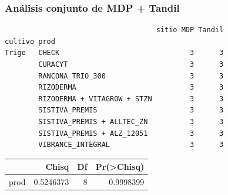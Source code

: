 \documentclass[
  letterpaper,
  DIV=11,
  numbers=noendperiod]{scrartcl}
\begin{document}
\hypertarget{anuxe1lisis-conjunto-de-mdp-tandil-1}{%
\subsubsection{Análisis conjunto de MDP +
Tandil}\label{anuxe1lisis-conjunto-de-mdp-tandil-1}}

\begin{verbatim}
                                    sitio MDP Tandil
cultivo prod                                        
Trigo   CHECK                               3      3
        CURACYT                             3      3
        RANCONA_TRIO_300                    3      3
        RIZODERMA                           3      3
        RIZODERMA + VITAGROW + STZN         3      3
        SISTIVA_PREMIS                      3      3
        SISTIVA_PREMIS + ALLTEC_ZN          3      3
        SISTIVA_PREMIS + ALZ_12051          3      3
        VIBRANCE_INTEGRAL                   3      3
\end{verbatim}

\begin{longtable}[]{@{}lrrr@{}}
\toprule()
& Chisq & Df & Pr(\textgreater Chisq) \\
\midrule()
\endhead
prod & 0.5246373 & 8 & 0.9998399 \\
\bottomrule()
\end{longtable}
\end{document}
